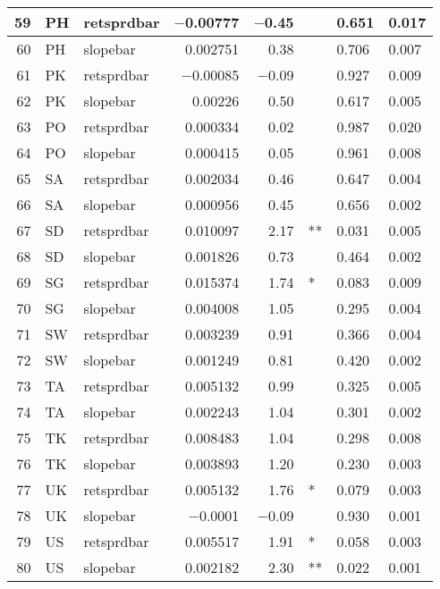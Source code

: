 \begin{longtable}{|r|l|l|r|r|l|l|l|}
   59 &    PH &    retsprdbar &    $-$0.00777 &    $-$0.45 &      &    0.651 &    0.017\\\hline
   60 &    PH &    slopebar &    0.002751 &    0.38 &      &    0.706 &    0.007\\\hline
   61 &    PK &    retsprdbar &    $-$0.00085 &    $-$0.09 &      &    0.927 &    0.009\\\hline
   62 &    PK &    slopebar &    0.00226 &    0.50 &      &    0.617 &    0.005\\\hline
   63 &    PO &    retsprdbar &    0.000334 &    0.02 &      &    0.987 &    0.020\\\hline
   64 &    PO &    slopebar &    0.000415 &    0.05 &      &    0.961 &    0.008\\\hline
   65 &    SA &    retsprdbar &    0.002034 &    0.46 &      &    0.647 &    0.004\\\hline
   66 &    SA &    slopebar &    0.000956 &    0.45 &      &    0.656 &    0.002\\\hline
   67 &    SD &    retsprdbar &    0.010097 &    2.17 &    ** &    0.031 &    0.005\\\hline
   68 &    SD &    slopebar &    0.001826 &    0.73 &      &    0.464 &    0.002\\\hline
   69 &    SG &    retsprdbar &    0.015374 &    1.74 &    * &    0.083 &    0.009\\\hline
   70 &    SG &    slopebar &    0.004008 &    1.05 &      &    0.295 &    0.004\\\hline
   71 &    SW &    retsprdbar &    0.003239 &    0.91 &      &    0.366 &    0.004\\\hline
   72 &    SW &    slopebar &    0.001249 &    0.81 &      &    0.420 &    0.002\\\hline
   73 &    TA &    retsprdbar &    0.005132 &    0.99 &      &    0.325 &    0.005\\\hline
   74 &    TA &    slopebar &    0.002243 &    1.04 &      &    0.301 &    0.002\\\hline
   75 &    TK &    retsprdbar &    0.008483 &    1.04 &      &    0.298 &    0.008\\\hline
   76 &    TK &    slopebar &    0.003893 &    1.20 &      &    0.230 &    0.003\\\hline
   77 &    UK &    retsprdbar &    0.005132 &    1.76 &    * &    0.079 &    0.003\\\hline
   78 &    UK &    slopebar &    $-$0.0001 &    $-$0.09 &      &    0.930 &    0.001\\\hline
   79 &    US &    retsprdbar &    0.005517 &    1.91 &    * &    0.058 &    0.003\\\hline
   80 &    US &    slopebar &    0.002182 &    2.30 &    ** &    0.022 &    0.001\\\hline
\end{longtable}


